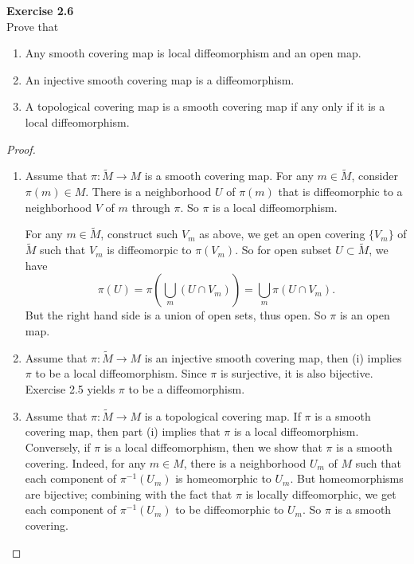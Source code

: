 \documentclass[12pt, a4paper]{article}
\theoremstyle{plain}
\def\tilde{\widetilde}
\newenvironment{exercise}[2][Exercise]
    { \begin{mdframed}[backgroundcolor=gray!20] \textbf{#1 #2} \\}
    {  \end{mdframed}}
\begin{document}
\begin{exercise}{2.6}
    Prove that
    \begin{enumerate}[label=(\roman*)]
        \item Any smooth covering map is local diffeomorphism and an open map.
        \item An injective smooth covering map is a diffeomorphism.
        \item A topological covering map is a smooth covering map if any only if it is a local diffeomorphism.
    \end{enumerate}
\end{exercise}
    \begin{proof}
        \begin{enumerate}[label=(\roman*)]
            \item Assume that $\pi\colon \tilde M\to M$ is a smooth covering map. For any $m\in \tilde M$, consider $\pi(m)\in M$. There is a neighborhood $U$ of $\pi(m)$ that is diffeomorphic to a neighborhood $V$ of $m$ through $\pi$. So $\pi$ is a local diffeomorphism.

            For any $m\in \tilde M$, construct such $V_m$ as above, we get an open covering $\{V_m\}$ of $\tilde M$ such that $V_m$ is diffeomorpic to $\pi(V_m)$. So for open subset $U\subset \tilde M$, we have
            \[
            \pi(U)=\pi\left(\bigcup_m (U\cap V_m)\right)=\bigcup_m \pi(U\cap V_m).
            \]
            But the right hand side is a union of open sets, thus open. So $\pi$ is an open map.
            \item Assume that $\pi\colon \tilde M\to M$ is an injective smooth covering map, then (i) implies $\pi$ to be a local diffeomorphism. Since $\pi$ is surjective, it is also bijective. Exercise 2.5 yields $\pi$ to be a diffeomorphism.
            \item Assume that $\pi\colon \tilde M\to M$ is a topological covering map. If $\pi$ is a smooth covering map, then part (i) implies that $\pi$ is a local diffeomorphism. Conversely, if $\pi$ is a local diffeomorphism, then we show that $\pi$ is a smooth covering. Indeed, for any $m\in M$, there is a neighborhood $U_m$ of $M$ such that each component of $\pi^{-1}(U_m)$ is homeomorphic to $U_m$. But homeomorphisms are bijective; combining with the fact that $\pi$ is locally diffeomorphic, we get each component of $\pi^{-1}(U_m)$ to be diffeomorphic to $U_m$. So $\pi$ is a smooth covering.
        \end{enumerate}
    \end{proof}
\end{document}
